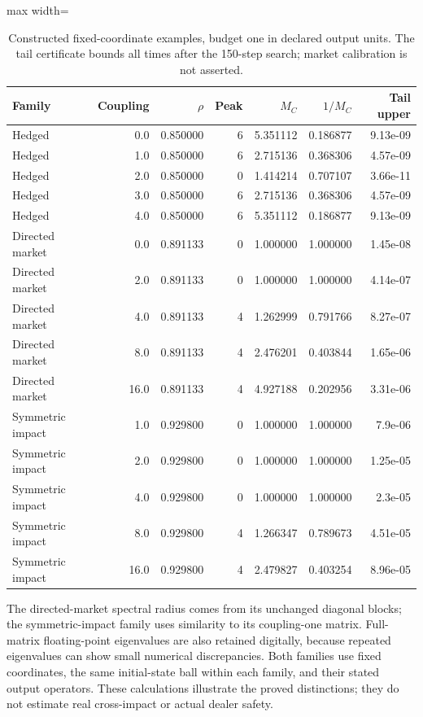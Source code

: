 \begin{table}[htbp]
\centering\small
\caption{Constructed fixed-coordinate examples, budget one in declared output units. The tail certificate bounds all times after the 150-step search; market calibration is not asserted.}\label{tab:risk_contract_examples}
\begin{adjustbox}{max width=\textwidth}
\begin{tabular}{lrrrrrr}\toprule
Family & Coupling & $\rho$ & Peak & $M_C$ & $1/M_C$ & Tail upper\\\midrule
Hedged & 0.0 & 0.850000 & 6 & 5.351112 & 0.186877 & 9.13e-09\\
Hedged & 1.0 & 0.850000 & 6 & 2.715136 & 0.368306 & 4.57e-09\\
Hedged & 2.0 & 0.850000 & 0 & 1.414214 & 0.707107 & 3.66e-11\\
Hedged & 3.0 & 0.850000 & 6 & 2.715136 & 0.368306 & 4.57e-09\\
Hedged & 4.0 & 0.850000 & 6 & 5.351112 & 0.186877 & 9.13e-09\\
Directed market & 0.0 & 0.891133 & 0 & 1.000000 & 1.000000 & 1.45e-08\\
Directed market & 2.0 & 0.891133 & 0 & 1.000000 & 1.000000 & 4.14e-07\\
Directed market & 4.0 & 0.891133 & 4 & 1.262999 & 0.791766 & 8.27e-07\\
Directed market & 8.0 & 0.891133 & 4 & 2.476201 & 0.403844 & 1.65e-06\\
Directed market & 16.0 & 0.891133 & 4 & 4.927188 & 0.202956 & 3.31e-06\\
Symmetric impact & 1.0 & 0.929800 & 0 & 1.000000 & 1.000000 & 7.9e-06\\
Symmetric impact & 2.0 & 0.929800 & 0 & 1.000000 & 1.000000 & 1.25e-05\\
Symmetric impact & 4.0 & 0.929800 & 0 & 1.000000 & 1.000000 & 2.3e-05\\
Symmetric impact & 8.0 & 0.929800 & 4 & 1.266347 & 0.789673 & 4.51e-05\\
Symmetric impact & 16.0 & 0.929800 & 4 & 2.479827 & 0.403254 & 8.96e-05\\
\bottomrule\end{tabular}
\end{adjustbox}
\end{table}
The directed-market spectral radius comes from its unchanged diagonal blocks; the symmetric-impact family uses similarity to its coupling-one matrix. Full-matrix floating-point eigenvalues are also retained digitally, because repeated eigenvalues can show small numerical discrepancies. Both families use fixed coordinates, the same initial-state ball within each family, and their stated output operators. These calculations illustrate the proved distinctions; they do not estimate real cross-impact or actual dealer safety.
